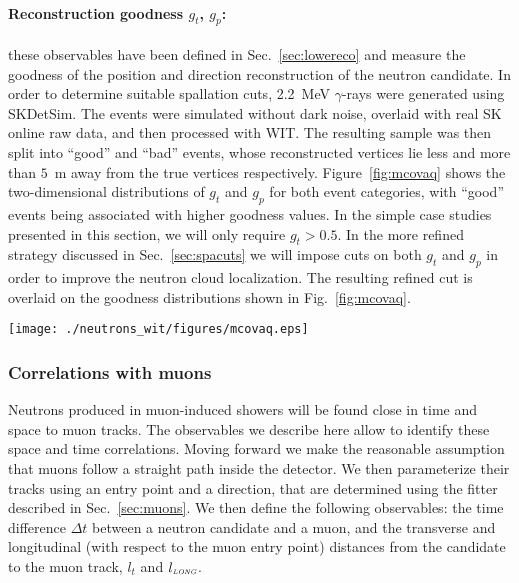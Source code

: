\paragraph{Reconstruction goodness $g_t$, $g_p$: } these observables have been defined in Sec.~\ref{sec:lowereco} and measure the goodness of the position and direction reconstruction of the neutron candidate. In order to determine suitable spallation cuts, 2.2~MeV $\gamma$-rays were generated using SKDetSim. The events were simulated without dark noise, overlaid with real SK online raw data, and then processed with WIT. The resulting sample was then split into ``good'' and ``bad'' events, whose reconstructed vertices lie less and more than $5$~m away from the true vertices respectively. Figure~\ref{fig:mcovaq} shows the two-dimensional distributions of $g_t$ and $g_p$ for both event categories, with ``good'' events being associated with higher goodness values. In the simple case studies presented in this section, we will only require $g_t > 0.5$. In the more refined strategy discussed in Sec.~\ref{sec:spacuts} we will impose cuts on both $g_t$ and $g_p$ in order to improve the neutron cloud localization. The resulting refined cut is overlaid on the goodness distributions shown in Fig.~\ref{fig:mcovaq}.
 
 \begin{figure*}
    \centering
    \texttt{[image: ./neutrons\_wit/figures/mcovaq.eps]}
    \caption{MC generated 2.2~MeV $\gamma$-rays processed by WIT software. The left distribution shows ``poorly" reconstructed events as defined as reconstructed vertex being more then 5~m from MC truth and the right distribution shows the ``good" reconstructions. The lines separate the different weight regions used to parameterize the neutron cloud cuts described in Sec.~\ref{sec:cloudcut}.}
    \label{fig:mcovaq}
\end{figure*}
 
\subsubsection{Correlations with muons}
\label{sec:corrmu}
Neutrons produced in muon-induced showers will be found close in time and space to muon tracks. The observables we describe here allow to identify these space and time correlations. Moving forward we make the reasonable assumption that muons follow a straight path inside the detector. We then parameterize their tracks using an entry point and a direction, that are determined using the fitter described in Sec.~\ref{sec:muons}. We then define the following observables: the time difference $\Delta t$ between a neutron candidate and a muon, and the transverse and longitudinal (with respect to the muon entry point) distances from the candidate to the muon track, $l_t$ and $l_{\mbox{\tiny \it LONG}}$.

